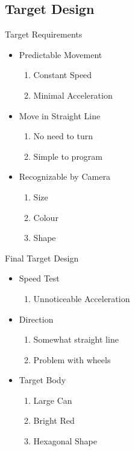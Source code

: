 \subsection{Target Design} 
\begin{frame}{Target Requirements}
\begin{itemize}
    \item Predictable Movement
    	\begin{enumerate}
    	    \item Constant Speed 
  			\item Minimal Acceleration
		\end{enumerate}
    \item Move in Straight Line
    	\begin{enumerate}
  			\item No need to turn
  			\item Simple to program
		\end{enumerate}
    \item Recognizable by Camera
    	\begin{enumerate}
  			\item Size
  			\item Colour
  			\item Shape
		\end{enumerate}
\end{itemize}
\end{frame}

\begin{frame}{Final Target Design}

\begin{itemize}
    \item Speed Test
    	\begin{enumerate}
  			\item Unnoticeable Acceleration
		\end{enumerate}
    \item Direction
    	\begin{enumerate}
  			\item Somewhat straight line
  			\item Problem with wheels
		\end{enumerate}
	\item Target Body
		\begin{enumerate}
  			\item Large Can
  			\item Bright Red
  			\item Hexagonal Shape
		\end{enumerate}
\end{itemize}
\end{frame}

